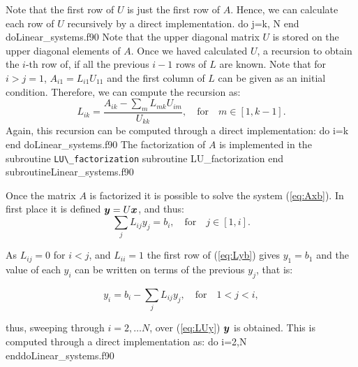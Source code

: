 Note that the first row of $U$ is just the first row of $A$. Hence, we can calculate each row of $U$ recursively by a direct implementation.    
 \vspace{0.5cm} 
 {do j=k, N}
 {end do}{Linear_systems.f90}
 Note that the upper diagonal matrix $U$ is stored on the upper diagonal elements of $A$.
 Once we haved calculated $U$, a recursion to obtain the $i$-th row of, if all the previous $i-1$ rows of $L$ are known. Note that for $i>j=1$, $A_{i1}=  L_{i1} U_{11}$ and the first column of $L$ can be given as an initial condition. Therefore, we can compute the recursion as:
 \begin{equation}
 L_{ik} 
 = 
 \frac
 {A_{ik} - \sum_{m} L_{mk}U_{im} }
 {U_{kk}}
 , \quad \mbox{for} \quad m \in [1,k-1]. \label{eq:recurrence_c}
 \end{equation}
 Again, this recursion can be computed through a direct implementation:
 \vspace{0.5cm} 
 {do i=k}
 {end do}{Linear_systems.f90}
 The factorization of $A$ is implemented in the subroutine \verb|LU\_factorization|
  \vspace{0.5cm} 
 {subroutine LU_factorization}
 {end subroutine}{Linear_systems.f90}
 
 
 Once the matrix $A$ is factorized it is possible to solve the system (\ref{eq:Axb}). In first place it is defined $\boldsymbol{y}= U \boldsymbol{x}$, and thus:
 \begin{equation}
 \sum_{j}
 L_{ij}y_j 
 = 
 b_i,  
 \quad \mbox{for}\quad j \in [1,i] .\label{eq:Lyb}
 \end{equation}
 
 As $L_{ij}=0$ for $i<j$, and $L_{ii}=1$ the first row of (\ref{eq:Lyb}) gives $y_1=b_1$ and the value of each $y_i$ can be written on terms of the previous $y_j$, that is:
 
 \begin{equation}
 y_i = b_i - \sum_{j}L_{ij} y_j, \quad \mbox{for} \quad 1 < j < i, \label{eq:LUy}
 \end{equation}
 
 thus, sweeping through $i=2, \ldots N$, over (\ref{eq:LUy}) $\boldsymbol{y}$ is obtained. This is computed through a direct implementation as:
 \vspace{0.5cm} 
 {do i=2,N}
 {enddo}{Linear_systems.f90}
 
